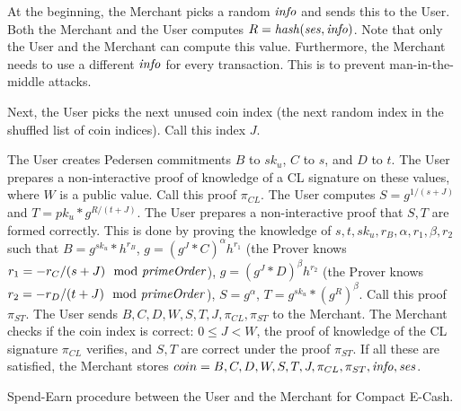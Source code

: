 At the beginning, the Merchant picks a random $\mathit{info}$ and sends this to the User. Both the Merchant and the User computes $R = \mathit{hash}(\mathit{ses},\mathit{info})$. Note that only the User and the Merchant can compute this value. Furthermore, the Merchant needs to use a different $\mathit{info}$ for every transaction. This is to prevent man-in-the-middle attacks.

Next, the User picks the next unused coin index (\ie the next random index in the shuffled list of coin indices). Call this index $J$.



\begin{algorithm}[H]\label{spendCompact}
\dontprintsemicolon

\BlankLine

 \;
\Indp
  The User creates Pedersen commitments $B$ to $sk_u$, $C$ to $s$, and $D$ to $t$. The User prepares a non-interactive proof of knowledge of a CL signature on these values, where $W$ is a public value. Call this proof $\pi_{CL}$. \;
  The User computes $S = g^{1/(s+J)}$ and $T = pk_u * g^{R/(t+J)}$. \;
  The User prepares a non-interactive proof that $S,T$ are formed correctly. This is done by proving the knowledge of $s,t,sk_u,r_B,\alpha,r_1,\beta,r_2$ such that $B = g^{sk_u} * h^{r_B}$, $g = (g^J * C)^{\alpha} h^{r_1}$ (the Prover knows $r_1 = - r_C / (s+J) \mod {\mathit{primeOrder}}$), $g = (g^J * D)^{\beta} h^{r_2}$ (the Prover knows $r_2 = - r_D / (t+J) \mod {\mathit{primeOrder}}$), $S = g^{\alpha}$, $T = g^{sk_u} * (g^R)^{\beta}$. Call this proof $\pi_{ST}$. \;
  The User sends $B,C,D,W,S,T,J,\pi_{CL},\pi_{ST}$ to the Merchant. \;
  The Merchant checks if the coin index is correct: $0 \leq J < W$, the proof of knowledge of the CL signature $\pi_{CL}$ verifies, and $S,T$ are correct under the proof $\pi_{ST}$. If all these are satisfied, the Merchant stores $coin = B,C,D,W,S,T,J,\pi_{CL},\pi_{ST},\mathit{info},\mathit{ses}$.  \;
\Indm

\caption{Spend-Earn procedure between the User and the Merchant for Compact E-Cash.}
\end{algorithm}



